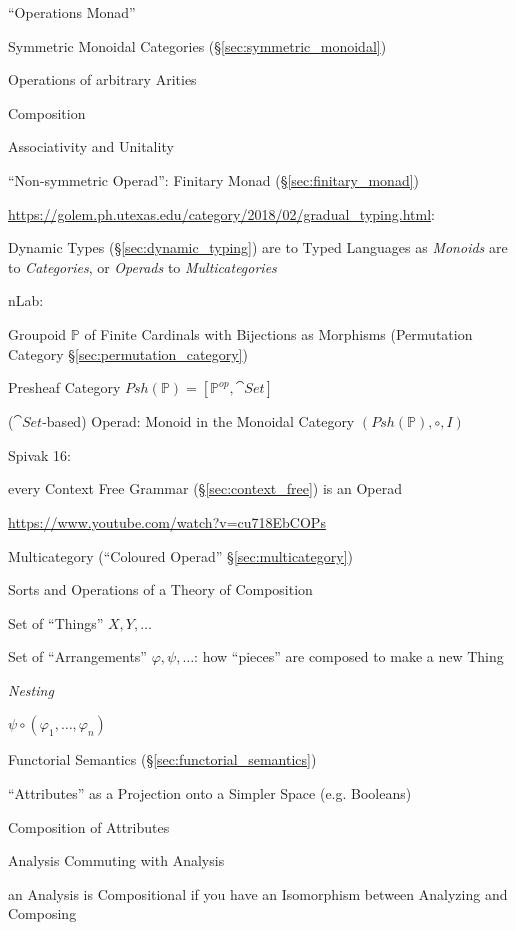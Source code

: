 ``Operations Monad''

Symmetric Monoidal Categories
(\S\ref{sec:symmetric_monoidal})

Operations of arbitrary Arities

Composition

Associativity and Unitality

``Non-symmetric Operad'': Finitary Monad (\S\ref{sec:finitary_monad})

\url{https://golem.ph.utexas.edu/category/2018/02/gradual_typing.html}:

Dynamic Types (\S\ref{sec:dynamic_typing}) are to Typed Languages as
\emph{Monoids} are to \emph{Categories}, or \emph{Operads} to
\emph{Multicategories}

nLab:

Groupoid $\mathbb{P}$ of Finite Cardinals with Bijections as Morphisms
(Permutation Category \S\ref{sec:permutation_category})

Presheaf Category $Psh(\mathbb{P}) = [\mathbb{P}^{op}, \cat{Set}]$

($\cat{Set}$-based) Operad: Monoid in the Monoidal Category
$(Psh(\mathbb{P}), \circ, I)$ %

Spivak 16:

every Context Free Grammar (\S\ref{sec:context_free}) is an Operad

\url{https://www.youtube.com/watch?v=cu718EbCOPs}


Multicategory (``Coloured Operad'' \S\ref{sec:multicategory})

Sorts and Operations of a Theory of Composition

Set of ``Things'' $X,Y,\ldots$

Set of ``Arrangements'' $\varphi,\psi,\ldots$: how ``pieces'' are
composed to make a new Thing

\emph{Nesting}

$\psi \circ (\varphi_1, \ldots, \varphi_n)$

Functorial Semantics (\S\ref{sec:functorial_semantics})

``Attributes'' as a Projection onto a Simpler Space (e.g. Booleans)

Composition of Attributes

Analysis Commuting with Analysis

an Analysis is Compositional if you have an Isomorphism between
Analyzing and Composing

